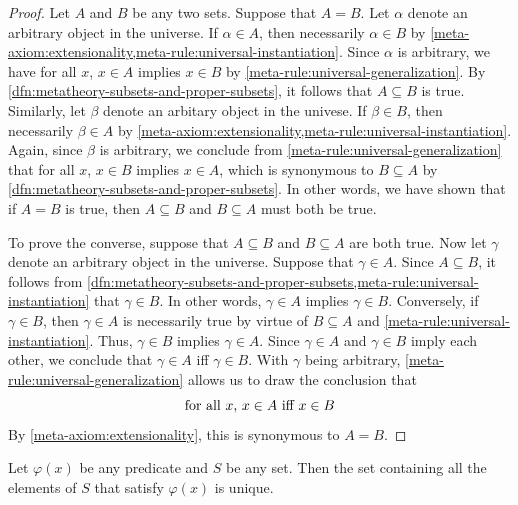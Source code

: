 \begin{proof}
    Let \( A \) and \( B \) be any two sets.
    Suppose that \( A = B \).
    Let \( \alpha \) denote an arbitrary object in the universe.
    If \( \alpha \in A \), then necessarily \( \alpha \in B \) by \cref{meta-axiom:extensionality,meta-rule:universal-instantiation}.
    Since \( \alpha \) is arbitrary, we have for all \( x \), \( x \in A \) implies \( x \in B \) by \cref{meta-rule:universal-generalization}.
    By \cref{dfn:metatheory-subsets-and-proper-subsets}, it follows that \( A \subseteq B \) is true.
    Similarly, let \( \beta \) denote an arbitary object in the univese.
    If \( \beta \in B \), then necessarily \( \beta \in A \) by \cref{meta-axiom:extensionality,meta-rule:universal-instantiation}.
    Again, since \( \beta \) is arbitrary, we conclude from \cref{meta-rule:universal-generalization} that for all \( x \), \( x \in B \) implies \( x \in A \),
    which is synonymous to \( B \subseteq A \) by \cref{dfn:metatheory-subsets-and-proper-subsets}.
    In other words, we have shown that if \( A = B \) is true, then \( A \subseteq B \) and \( B \subseteq A \) must both be true.

    \vspace{0.3cm}
    \noindent
    To prove the converse, suppose that \( A \subseteq B \) and \( B \subseteq A \) are both true.
    Now let \( \gamma \) denote an arbitrary object in the universe.
    Suppose that \( \gamma \in A \). Since \( A \subseteq B \), it follows from \cref{dfn:metatheory-subsets-and-proper-subsets,meta-rule:universal-instantiation}
    that \( \gamma \in B \). In other words, \( \gamma \in A \) implies \( \gamma \in B \).
    Conversely, if \( \gamma \in B \), then \( \gamma \in A \) is necessarily true by virtue of \( B \subseteq A \) and \cref{meta-rule:universal-instantiation}.
    Thus, \( \gamma \in B \) implies \( \gamma \in A \).
    Since \( \gamma \in A \) and \( \gamma \in B \) imply each other, we conclude that \( \gamma \in A \) iff \( \gamma \in B \).
    With \( \gamma \) being arbitrary, \cref{meta-rule:universal-generalization} allows us to draw the conclusion that
    \begin{equation*}
        \text{for all \( x \), \( x \in A \) iff \( x \in B \)}
    \end{equation*}
    By \cref{meta-axiom:extensionality}, this is synonymous to \( A = B \).
\end{proof}

\begin{thm}
     \label{thm:metatheory-uniqueness-of-specification-subset}
    Let \( \varphi(x) \) be any predicate and \( S \) be any set.
    Then the set containing all the elements of \( S \) that satisfy \( \varphi(x) \) is unique.
\end{thm}

